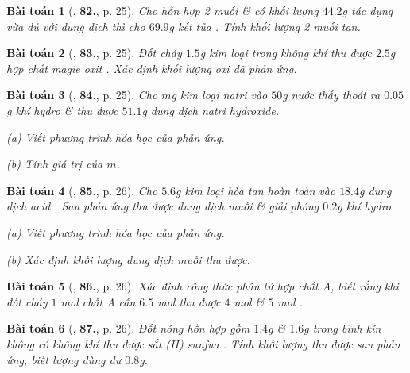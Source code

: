 \documentclass{article}
\numberwithin{equation}{section}
\newtheorem{baitoan}{Bài toán}
\begin{document}
\begin{baitoan}[\cite{An2011}, \textbf{82.}, p. 25]
	Cho hỗn hợp 2 muối  \&  có khối lượng $44.2$g tác dụng vừa đủ với dung dịch  thì cho $69.9$g kết tủa . Tính khối lượng 2 muối tan.
\end{baitoan}

\begin{baitoan}[\cite{An2011}, \textbf{83.}, p. 25]
	Đốt cháy $1.5$g kim loại  trong không khí thu được $2.5$g hợp chất magie oxit . Xác định khối lượng oxi đã phản ứng.
\end{baitoan}

\begin{baitoan}[\cite{An2011}, \textbf{84.}, p. 25]
	Cho $m$g kim loại natri vào $50$g nước thấy thoát ra $0.05$g khí hydro \& thu được $51.1$g dung dịch natri hydroxide.
	\begin{enumerate*}
		\item[(a)] Viết phương trình hóa học của phản ứng.
		\item[(b)] Tính giá trị của $m$.
	\end{enumerate*}
\end{baitoan}

\begin{baitoan}[\cite{An2011}, \textbf{85.}, p. 26]
	Cho $5.6$g kim loại  hòa tan hoàn  toàn vào $18.4$g dung dịch acid . Sau phản ứng thu được dung dịch muối  \& giải phóng $0.2$g khí hydro.
	\begin{enumerate*}
		\item[(a)] Viết phương trình hóa học của phản ứng.
		\item[(b)] Xác định khối lượng dung dịch muối  thu được.
	\end{enumerate*}
\end{baitoan}

\begin{baitoan}[\cite{An2011}, \textbf{86.}, p. 26]
	Xác định công thức phân tử hợp chất A, biết rằng khi đốt cháy $1$ mol chất A cần $6.5$ mol  thu được $4$ mol  \& $5$ mol .
\end{baitoan}

\begin{baitoan}[\cite{An2011}, \textbf{87.}, p. 26]
	Đốt nóng hỗn hợp gồm $1.4$g  \& $1.6$g  trong bình kín không có không khí thu được sắt (II) sunfua . Tính khối lượng  thu được sau phản ứng, biết lượng  dùng dư $0.8$g.
\end{baitoan}
\end{document}
